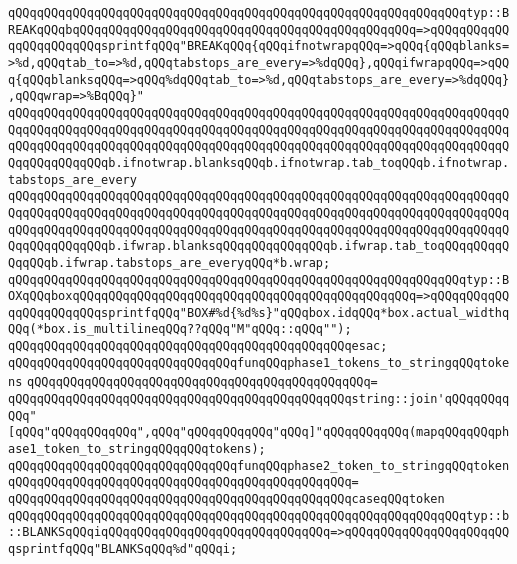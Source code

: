 \verb|qQQqqQQqqQQqqQQqqQQqqQQqqQQqqQQqqQQqqQQqqQQqqQQqqQQqqQQqqQQqqQQqtyp::BREAKqQQqbqQQqqQQqqQQqqQQqqQQqqQQqqQQqqQQqqQQqqQQqqQQqqQQq=>qQQqqQQqqQQqqQQqqQQqqQQqsprintfqQQq"BREAKqQQq{qQQqifnotwrapqQQq=>qQQq{qQQqblanks=>%d,qQQqtab_to=>%d,qQQqtabstops_are_every=>%dqQQq},qQQqifwrapqQQq=>qQQq{qQQqblanksqQQq=>qQQq%dqQQqtab_to=>%d,qQQqtabstops_are_every=>%dqQQq},qQQqwrap=>%BqQQq}"|\newline
\verb|qQQqqQQqqQQqqQQqqQQqqQQqqQQqqQQqqQQqqQQqqQQqqQQqqQQqqQQqqQQqqQQqqQQqqQQqqQQqqQQqqQQqqQQqqQQqqQQqqQQqqQQqqQQqqQQqqQQqqQQqqQQqqQQqqQQqqQQqqQQqqQQqqQQqqQQqqQQqqQQqqQQqqQQqqQQqqQQqqQQqqQQqqQQqqQQqqQQqqQQqqQQqqQQqqQQqqQQqqQQqqQQqb.ifnotwrap.blanksqQQqb.ifnotwrap.tab_toqQQqb.ifnotwrap.tabstops_are_every|\newline
\verb|qQQqqQQqqQQqqQQqqQQqqQQqqQQqqQQqqQQqqQQqqQQqqQQqqQQqqQQqqQQqqQQqqQQqqQQqqQQqqQQqqQQqqQQqqQQqqQQqqQQqqQQqqQQqqQQqqQQqqQQqqQQqqQQqqQQqqQQqqQQqqQQqqQQqqQQqqQQqqQQqqQQqqQQqqQQqqQQqqQQqqQQqqQQqqQQqqQQqqQQqqQQqqQQqqQQqqQQqqQQqqQQqb.ifwrap.blanksqQQqqQQqqQQqqQQqb.ifwrap.tab_toqQQqqQQqqQQqqQQqb.ifwrap.tabstops_are_everyqQQq*b.wrap;|\newline
\verb|qQQqqQQqqQQqqQQqqQQqqQQqqQQqqQQqqQQqqQQqqQQqqQQqqQQqqQQqqQQqqQQqtyp::BOXqQQqboxqQQqqQQqqQQqqQQqqQQqqQQqqQQqqQQqqQQqqQQqqQQqqQQq=>qQQqqQQqqQQqqQQqqQQqqQQqsprintfqQQq"BOX#%d{%d%s}"qQQqbox.idqQQq*box.actual_widthqQQq(*box.is_multilineqQQq??qQQq"M"qQQq::qQQq"");|\newline
\verb|qQQqqQQqqQQqqQQqqQQqqQQqqQQqqQQqqQQqqQQqqQQqqQQqesac;|\newline
\newline
\verb|qQQqqQQqqQQqqQQqqQQqqQQqqQQqqQQqfunqQQqphase1_tokens_to_stringqQQqtokens|\newline
\verb|qQQqqQQqqQQqqQQqqQQqqQQqqQQqqQQqqQQqqQQqqQQqqQQq=|\newline
\verb|qQQqqQQqqQQqqQQqqQQqqQQqqQQqqQQqqQQqqQQqqQQqqQQqstring::join'qQQqqQQqqQQq"[qQQq"qQQqqQQqqQQq",qQQq"qQQqqQQqqQQq"qQQq]"qQQqqQQqqQQq(mapqQQqqQQqphase1_token_to_stringqQQqqQQqtokens);|\newline
\newline
\newline
\verb|qQQqqQQqqQQqqQQqqQQqqQQqqQQqqQQqfunqQQqphase2_token_to_stringqQQqtoken|\newline
\verb|qQQqqQQqqQQqqQQqqQQqqQQqqQQqqQQqqQQqqQQqqQQqqQQq=|\newline
\verb|qQQqqQQqqQQqqQQqqQQqqQQqqQQqqQQqqQQqqQQqqQQqqQQqcaseqQQqtoken|\newline
\verb|qQQqqQQqqQQqqQQqqQQqqQQqqQQqqQQqqQQqqQQqqQQqqQQqqQQqqQQqqQQqqQQqtyp::b::BLANKSqQQqiqQQqqQQqqQQqqQQqqQQqqQQqqQQqqQQq=>qQQqqQQqqQQqqQQqqQQqqQQqsprintfqQQq"BLANKSqQQq%d"qQQqi;|\newline
